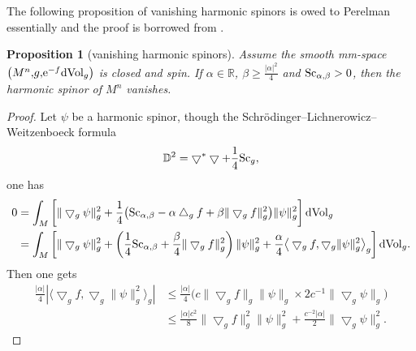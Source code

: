 \documentclass[10pt,a4paper]{amsart}
\newtheorem{Proposition}[Theorem]{Proposition}
\begin{document}
The following proposition of vanishing harmonic spinors is owed to Perelman essentially and the proof is borrowed from \cite[Proposition~1]{MR3625165}.

\begin{Proposition}[vanishing harmonic spinors]\label{vanishing}
Assume the smooth mm-space $\big(M^n{,} g{,} {\rm e}^{-f} {\rm dVol}_g\big)$ is closed and spin. If $\alpha \in \mathbb{R}$, $\beta \geq \frac{|\alpha|^2}{4}$ and ${\rm Sc}_{\alpha, \beta}>0$, then the harmonic spinor of $M^n$ vanishes.
\end{Proposition}

\begin{proof}Let $\psi$ be a harmonic spinor, though the Schr\"odinger--Lichnerowicz--Weitzenboeck formula
\begin{align*}
\mathbb{D}^2=\bigtriangledown^*\bigtriangledown + \frac{1}{4}{\rm Sc}_g,
\end{align*}
 one has
\begin{align*}
0& = \int_M \left[\|\bigtriangledown_g\psi\|^2_g + \frac{1}{4}\big({\rm Sc}_{\alpha, \beta} - \alpha \bigtriangleup_g f + \beta\|\bigtriangledown_gf\|^2_g\big)\|\psi\|^2_g \right] {\rm dVol}_g\\
& = \int_M \left[\|\bigtriangledown_g\psi\|^2_g + \left(\frac{1}{4}{\rm Sc}_{\alpha, \beta} + \frac{\beta}{4}\|\bigtriangledown_g f\|^2_g\right)\|\psi\|^2_g + \frac{\alpha}{4} \big\langle \bigtriangledown_gf, \bigtriangledown_g\|\psi\|^2_g\big\rangle_g\right] {\rm dVol}_g .
\end{align*}
Then one gets
\begin{align*}
\frac{|\alpha|}{4}|\big\langle\bigtriangledown_g f,\bigtriangledown_g\|\psi\|^2_g \big\rangle_g| & \leq\frac{|\alpha|}{4}\big(c\|\bigtriangledown_gf\|_g \|\psi\|_g \times 2c^{-1}\|\bigtriangledown_g\psi\|_g\big)\\
& \leq \frac{|\alpha| c^2}{8} \|\bigtriangledown_gf\|^2_g \|\psi\|^2_g + \frac{c^{-2}|\alpha|}{2}\|\bigtriangledown_g\psi\|^2_g.
\end{align*}


\end{proof}
\end{document}

